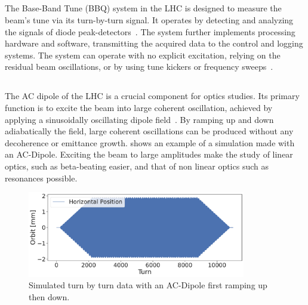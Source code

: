 \subsection{}

The Base-Band Tune (BBQ) system in the LHC is designed to measure the beam's tune via its
turn-by-turn signal. It operates by detecting and analyzing the signals of diode
peak-detectors~\cite{boccardi_first_2009,gasior_high_2005}. The system further implements processing
hardware and software, transmitting the acquired data to the control and logging systems.  The
system can operate with no explicit excitation, relying on the residual beam oscillations, or by
using tune kickers or frequency sweeps~\cite{boccardi_first_2009}.


\subsection{}

The AC dipole of the LHC is a crucial component for optics studies. Its primary function is to
excite the beam into large coherent oscillation, achieved by applying a sinusoidally oscillating
dipole field~\cite{miyamoto_parametrization_2008}. By ramping up and down adiabatically the field,
large coherent oscillations can be produced without any decoherence or emittance growth.
 shows an example of a simulation made with an AC-Dipole. Exciting the beam to
large amplitudes make the study of linear optics, such as beta-beating easier, and that of non
linear optics such as resonances possible.

\begin{figure}
    \center
    \includegraphics[width=0.85\textwidth]{./images/ac_dipole_tbt.pdf}
    \caption{Simulated turn by turn data with an AC-Dipole first ramping up then down.} 
    \label{fig:ac_dipole}
\end{figure}

